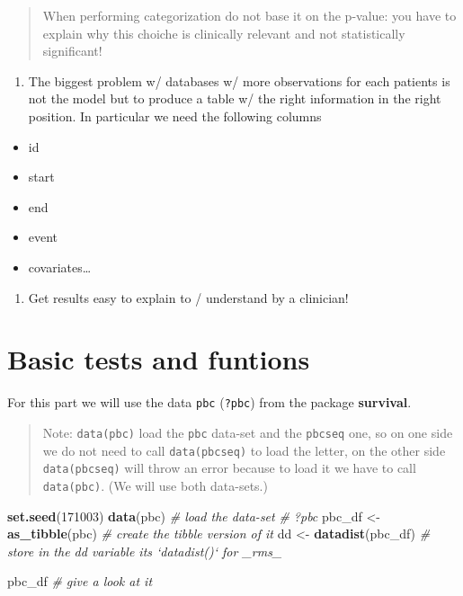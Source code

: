 \documentclass[]{book}
\newenvironment{Shaded}{\begin{snugshade}}{\end{snugshade}}
\newcommand{\KeywordTok}[1]{\textcolor[rgb]{0.13,0.29,0.53}{\textbf{{#1}}}}
\newcommand{\DecValTok}[1]{\textcolor[rgb]{0.00,0.00,0.81}{{#1}}}
\newcommand{\StringTok}[1]{\textcolor[rgb]{0.31,0.60,0.02}{{#1}}}
\newcommand{\CommentTok}[1]{\textcolor[rgb]{0.56,0.35,0.01}{\textit{{#1}}}}
\newcommand{\NormalTok}[1]{{#1}}
\providecommand{\tightlist}{%
  \setlength{\itemsep}{0pt}\setlength{\parskip}{0pt}}
\theoremstyle{definition}
\theoremstyle{definition}
\theoremstyle{definition}
\theoremstyle{remark}
\begin{document}
\begin{quote}
When performing categorization do not base it on the p-value: you have
to explain why this choiche is clinically relevant and not statistically
significant!
\end{quote}

\begin{enumerate}
\def\labelenumi{\arabic{enumi}.}
\setcounter{enumi}{3}
\tightlist
\item
  The biggest problem w/ databases w/ more observations for each
  patients is not the model but to produce a table w/ the right
  information in the right position. In particular we need the following
  columns
\end{enumerate}

\begin{itemize}
\tightlist
\item
  id
\item
  start
\item
  end
\item
  event
\item
  covariates\ldots{}
\end{itemize}

\begin{enumerate}
\def\labelenumi{\arabic{enumi}.}
\setcounter{enumi}{4}
\tightlist
\item
  Get results easy to explain to / understand by a clinician!
\end{enumerate}

\section{Basic tests and funtions}\label{test2}

For this part we will use the data \texttt{pbc} (\texttt{?pbc}) from the
package \textbf{survival}.

\begin{quote}
Note: \texttt{data(pbc)} load the \texttt{pbc} data-set and the
\texttt{pbcseq} one, so on one side we do not need to call
\texttt{data(pbcseq)} to load the letter, on the other side
\texttt{data(pbcseq)} will throw an error because to load it we have to
call \texttt{data(pbc)}. (We will use both data-sets.)
\end{quote}

\begin{Shaded}
\begin{Highlighting}[]
\KeywordTok{set.seed}\NormalTok{(}\DecValTok{171003}\NormalTok{)}
\KeywordTok{data}\NormalTok{(pbc)                                                    }\CommentTok{# load the data-set}
\CommentTok{# ?pbc}
\NormalTok{pbc_df <-}\StringTok{ }\KeywordTok{as_tibble}\NormalTok{(pbc)                       }\CommentTok{# create the tibble version of it}
\NormalTok{dd <-}\StringTok{ }\KeywordTok{datadist}\NormalTok{(pbc_df)     }\CommentTok{# store in the dd variable its `datadist()` for _rms_}

\NormalTok{pbc_df                                                       }\CommentTok{# give a look at it}
\end{Highlighting}
\end{Shaded}
\end{document}
